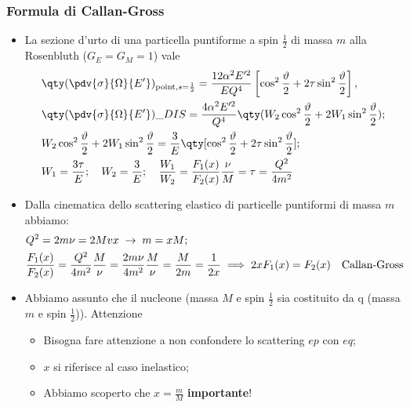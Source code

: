\subsubsection{Formula di Callan-Gross}
\begin{itemize}
    \item La sezione d'urto di una particella puntiforme a spin $\frac{1}{2}$ di massa $m$ alla Rosenbluth ($G_E=G_M=1$) vale
    \begin{align*}
        &\qty(\pdv{\sigma}{\Omega}{E'})_{\textnormal{point},s=\frac12}= \frac{12\alpha^2 E'^2}{EQ^4} 
        \left[ \cos^2 \frac{\vartheta}{2} + 2 \tau \sin^2 \frac{\vartheta}{2} \right],\\
        &\qty(\pdv{\sigma}{\Omega}{E'})\_{DIS}=\frac{4\alpha^2E'^2}{Q^4}\qty(W_2\cos^2\frac{\vartheta}{2}+2W_1\sin^2\frac{\vartheta}{2});\\
        &W_2\cos^2\frac{\vartheta}{2}+2W_1\sin^2\frac{\vartheta}{2}=\frac{3}{E}\qty[\cos^2\frac{\vartheta}{2}+2\tau\sin^2\frac{\vartheta}{2}];\\
        &W_1=\frac{3\tau}{E};\quad W_2=\frac{3}{E};\quad \frac{W_1}{W_2}=\frac{F_1(x)}{F_2(x)}\frac{\nu}{M}=\tau=\frac{Q^2}{4m^2}
        \end{align*}
        \item Dalla cinematica dello scattering elastico di particelle puntiformi di massa $m$ abbiamo:
        \begin{align*}
            &Q^2 = 2m\nu = 2Mv x \; \rightarrow \; m = xM;\\
            &\frac{F_1(x)}{F_2(x)}=\frac{Q^2}{4m^2}\frac{M}{\nu}=\frac{2m\nu}{4m^2}\frac{M}{\nu}=\frac{M}{2m}=\frac{1}{2x}\implies 2xF_1(x)=F_2(x)\quad\textnormal{Callan-Gross}
        \end{align*}
        \item Abbiamo assunto che il nucleone (massa $M$ e spin $\frac{1}{2}$ sia costituito da q (massa $m$ e spin $\frac{1}{2}$)). Attenzione
        \begin{itemize}
            \item Bisogna fare attenzione a non confondere lo scattering $ep$ con $eq$;
            \item $x$ si riferisce al caso inelastico;
            \item Abbiamo scoperto che $x=\frac{m}{M}$ \textbf{importante}!
        \end{itemize} 
\end{itemize}
